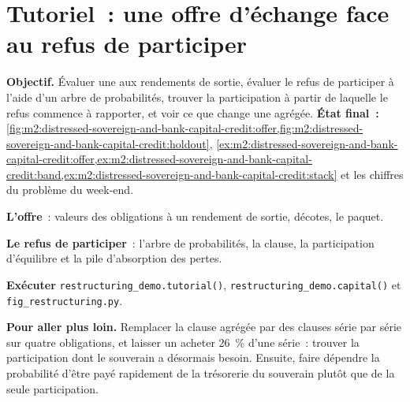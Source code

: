 \section{Tutoriel~: une offre d'échange face au refus de participer}\label{tut:m2:distressed-sovereign-and-bank-capital-credit:recovery}

\begin{tutorial}
\textbf{Objectif.} Évaluer une  aux rendements de sortie, évaluer le refus de participer à l'aide d'un
arbre de probabilités, trouver la participation à partir de laquelle le refus commence à rapporter, et voir
ce que change une  agrégée.
\textbf{État final~:} \cref{fig:m2:distressed-sovereign-and-bank-capital-credit:offer,fig:m2:distressed-sovereign-and-bank-capital-credit:holdout},
\cref{ex:m2:distressed-sovereign-and-bank-capital-credit:offer,ex:m2:distressed-sovereign-and-bank-capital-credit:band,ex:m2:distressed-sovereign-and-bank-capital-credit:stack}
et les chiffres du problème du week-end.
\begin{tutsteps}
\item \textbf{L'offre}~: valeurs des obligations à un rendement de sortie, décotes, le paquet.
\label{lst:m2:distressed-sovereign-and-bank-capital-credit:offer}
\item \textbf{Le refus de participer}~: l'arbre de probabilités, la clause, la participation d'équilibre
et la pile d'absorption des pertes.
\label{lst:m2:distressed-sovereign-and-bank-capital-credit:holdout}
\item \textbf{Exécuter} \texttt{restructuring\_demo.tutorial()},
\texttt{restructuring\_demo.capital()} et \texttt{fig\_restructuring.py}.
\end{tutsteps}
\textbf{Pour aller plus loin.} Remplacer la clause agrégée par des clauses série par série
sur quatre obligations, et laisser un  acheter 26~\% d'une série~: trouver la participation
dont le souverain a désormais besoin. Ensuite, faire dépendre la probabilité d'être payé rapidement
de la trésorerie du souverain plutôt que de la seule participation.
\end{tutorial}

